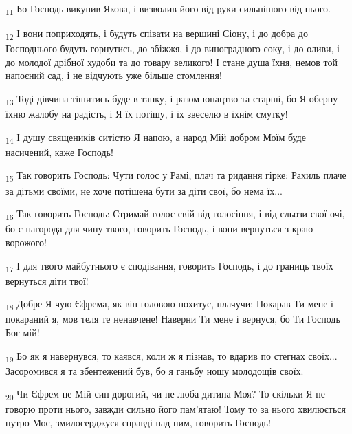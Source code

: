 \begin{tcolorbox}
\textsubscript{11} Бо Господь викупив Якова, і визволив його від руки сильнішого від нього.
\end{tcolorbox}
\begin{tcolorbox}
\textsubscript{12} І вони поприходять, і будуть співати на вершині Сіону, і до добра до Господнього будуть горнутись, до збіжжя, і до виноградного соку, і до оливи, і до молодої дрібної худоби та до товару великого! І стане душа їхня, немов той напоєний сад, і не відчують уже більше стомлення!
\end{tcolorbox}
\begin{tcolorbox}
\textsubscript{13} Тоді дівчина тішитись буде в танку, і разом юнацтво та старші, бо Я оберну їхню жалобу на радість, і Я їх потішу, і їх звеселю в їхнім смутку!
\end{tcolorbox}
\begin{tcolorbox}
\textsubscript{14} І душу священиків ситістю Я напою, а народ Мій добром Моїм буде насичений, каже Господь!
\end{tcolorbox}
\begin{tcolorbox}
\textsubscript{15} Так говорить Господь: Чути голос у Рамі, плач та ридання гірке: Рахиль плаче за дітьми своїми, не хоче потішена бути за діти свої, бо нема їх...
\end{tcolorbox}
\begin{tcolorbox}
\textsubscript{16} Так говорить Господь: Стримай голос свій від голосіння, і від сльози свої очі, бо є нагорода для чину твого, говорить Господь, і вони вернуться з краю ворожого!
\end{tcolorbox}
\begin{tcolorbox}
\textsubscript{17} І для твого майбутнього є сподівання, говорить Господь, і до границь твоїх вернуться діти твої!
\end{tcolorbox}
\begin{tcolorbox}
\textsubscript{18} Добре Я чую Єфрема, як він головою похитує, плачучи: Покарав Ти мене і покараний я, мов теля те ненавчене! Наверни Ти мене і вернуся, бо Ти Господь Бог мій!
\end{tcolorbox}
\begin{tcolorbox}
\textsubscript{19} Бо як я навернувся, то каявся, коли ж я пізнав, то вдарив по стегнах своїх... Засоромився я та збентежений був, бо я ганьбу ношу молодощів своїх.
\end{tcolorbox}
\begin{tcolorbox}
\textsubscript{20} Чи Єфрем не Мій син дорогий, чи не люба дитина Моя? То скільки Я не говорю проти нього, завжди сильно його пам'ятаю! Тому то за нього хвилюється нутро Моє, змилосерджуся справді над ним, говорить Господь!
\end{tcolorbox}
